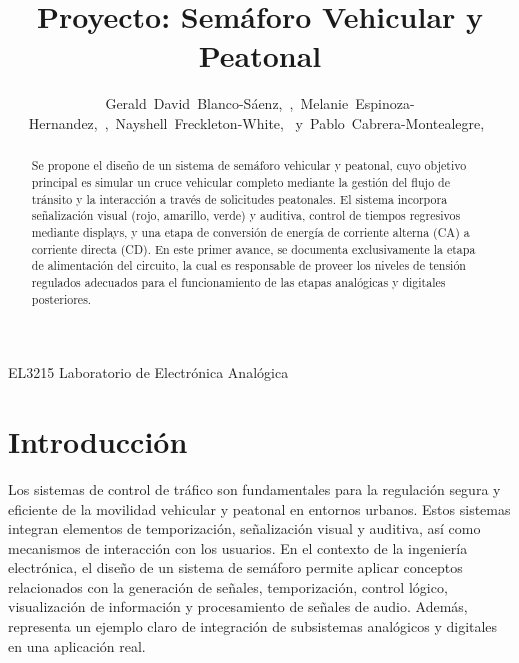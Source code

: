 \documentclass[12pt, journal, onecolumn]{IEEEtran}
\begin{document}
\title{Proyecto: Semáforo Vehicular y Peatonal}
	
	
\author{Gerald~David~Blanco-Sáenz,~,~Melanie~Espinoza-Hernandez,~,~Nayshell~Freckleton-White,~ 
	y~Pablo~Cabrera-Montealegre,~}
	
	
%
{EL3215 Laboratorio de Electrónica Analógica}
	
	
\maketitle
	
\begin{abstract}
		Se propone el diseño de un sistema de semáforo vehicular y peatonal, cuyo objetivo principal es simular un cruce vehicular completo mediante la gestión del flujo de tránsito y la interacción a través de solicitudes peatonales. El sistema incorpora señalización visual (rojo, amarillo, verde) y auditiva, control de tiempos regresivos mediante displays, y una etapa de conversión de energía de corriente alterna (CA) a corriente directa (CD). En este primer avance, se documenta exclusivamente la etapa de alimentación del circuito, la cual es responsable de proveer los niveles de tensión regulados adecuados para el funcionamiento de las etapas analógicas y digitales posteriores.
\end{abstract}
	
\section{Introducción}
	Los sistemas de control de tráfico son fundamentales para la regulación segura y eficiente de la movilidad vehicular y peatonal en entornos urbanos. Estos sistemas integran elementos de temporización, señalización visual y auditiva, así como mecanismos de interacción con los usuarios. En el contexto de la ingeniería electrónica, el diseño de un sistema de semáforo permite aplicar conceptos relacionados con la generación de señales, temporización, control lógico, visualización de información y procesamiento de señales de audio. Además, representa un ejemplo claro de integración de subsistemas analógicos y digitales en una aplicación real. 
	
\end{document}
